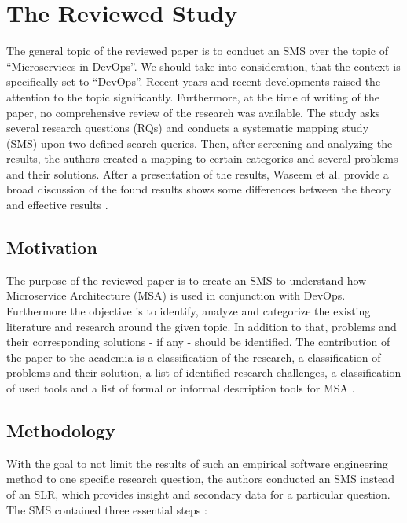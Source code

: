 \section{The Reviewed Study}
\label{sec:summary}

The general topic of the reviewed paper is to conduct an SMS over the topic
of ``Microservices in DevOps''. We should take into consideration, that the context
is specifically set to ``DevOps''. Recent years and recent developments
raised the attention to the topic significantly. Furthermore, at the
time of writing of the paper, no comprehensive review of the research was
available. The study asks several research questions (RQs) and conducts
a systematic mapping study (SMS) upon two defined search queries. Then,
after screening and analyzing the results, the authors created a mapping
to certain categories and several problems and their solutions.
After a presentation of the results, Waseem et al. provide a broad discussion of the found
results shows some differences between the theory and effective
results \cite{waseem:SMSMSADevOps}.

\subsection{Motivation}

The purpose of the reviewed paper is to create an SMS to understand how
Microservice Architecture (MSA) is used in conjunction with DevOps.
Furthermore the objective is to identify, analyze and categorize the
existing literature and research around the given topic.
In addition to that, problems and their corresponding solutions - if any - should
be identified. The contribution of the paper to the
academia is a classification of the research, a classification of problems
and their solution, a list of identified research challenges, a classification of
used tools and a list of formal or informal description
tools for MSA \cite{waseem:SMSMSADevOps}.

\subsection{Methodology}

With the goal to not limit the results of such an empirical software engineering method
to one specific research question, the authors conducted an SMS instead of an SLR,
which provides insight and secondary data for a particular question.
The SMS contained three essential steps \cite{waseem:SMSMSADevOps}:

